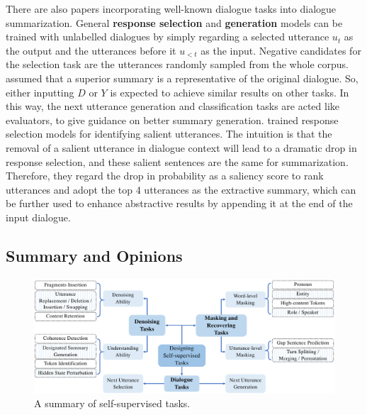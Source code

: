 There are also papers incorporating
well-known {dialogue tasks} into dialogue summarization. General \textbf{response 
selection} and \textbf{generation} models can be trained with unlabelled dialogues by 
simply regarding a selected utterance $u_t$ as the output and 
the utterances before it $u_{<t}$ as the input. Negative candidates for 
the selection task are the utterances randomly sampled from the whole corpus.
\citet{fuzw20} assumed that a superior summary is a representative of the 
original dialogue. So, either inputting $D$ or $Y$ is expected to achieve 
similar results on other tasks. In this way, the next utterance generation 
and classification tasks are acted like evaluators, to give guidance on better summary generation.
\citet{feigenblat-etal-2021-tweetsumm-dialog} trained response selection models for identifying salient utterances.
The intuition is that the removal of a salient utterance in dialogue context 
will lead to a dramatic drop in response selection, 
and these salient sentences are the same for summarization. 
Therefore, they regard the drop in probability as a saliency score to 
rank utterances and adopt the top 4 utterances as the
extractive summary, which can be further used to enhance abstractive 
results by appending it at the end of the input dialogue.

\subsection{Summary and Opinions}

\begin{figure}
	\centering
	\includegraphics[scale=0.65]{fig/approach-tasks.pdf}
	\caption{A summary of self-supervised tasks.}
	\label{fig:app-task}
\end{figure}

